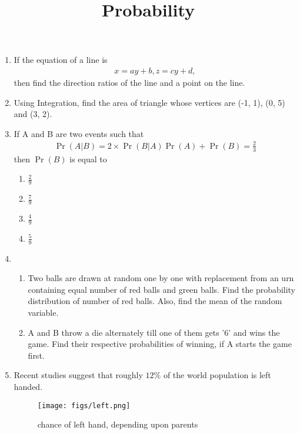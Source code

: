 \documentclass{article}
\providecommand{\pr}[1]{\ensuremath{\Pr\left(#1\right)}}
\begin{document}
\begin{enumerate}
\item If the equation of a line is
       \begin{align}
	x = ay + b, z = cy +d,
       \end{align}  then find the direction ratios of the line and a point on the line.

\item Using Integration, find the area of triangle whose vertices are (-1, 1), (0, 5) and (3, 2).

	\newpage

\title{\textbf{Probability}}
\date{}		
\maketitle
	
	\item If A and B are two events such that 
		\begin{align}
			\pr{A|B} = 2 \times  \pr{B|A}\pr{A} + \pr{B}  = \frac{2}{3}
		\end{align}then \pr{B}  is equal to
\begin{enumerate}
\item $\frac{2}{9}$
\item $\frac{7}{9}$
\item $\frac{4}{9}$
\item $\frac{5}{9}$
\end{enumerate}

\item
\begin{enumerate}
\item Two balls are drawn at random one by one with replacement from an urn containing equal number of red balls and green balls. Find the probability distribution of number of red balls. Also, find the mean of the random variable.
\item A and B throw a die alternately till one of them gets '6' and wins the game. Find their respective probabilities of winning, if A starts the game first.
\end{enumerate}

\item Recent studies suggest that roughly $12\%$ of the world population is left handed.
	
\begin{figure}[h!]
\centering
\texttt{[image: figs/left.png]}
\caption{chance of left hand, depending upon parents}
\label{fig:left.png}
\end{figure}


\end{enumerate}
\end{document}
